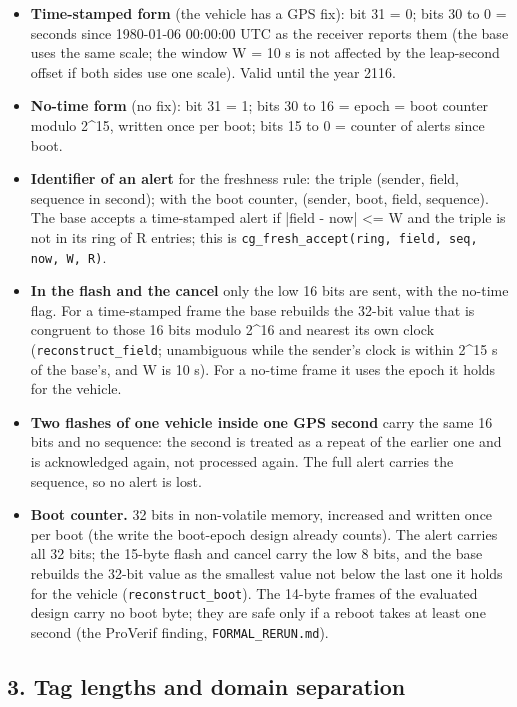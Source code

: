 \begin{itemize}
\item \textbf{Time-stamped form} (the vehicle has a GPS fix): bit 31 = 0; bits 30 to 0 = seconds since 1980-01-06 00:00:00 UTC as the receiver reports them (the base uses the same scale; the window W = 10 s is not affected by the leap-second offset if both sides use one scale). Valid until the year 2116.
\item \textbf{No-time form} (no fix): bit 31 = 1; bits 30 to 16 = epoch = boot counter modulo 2\textasciicircum{}15, written once per boot; bits 15 to 0 = counter of alerts since boot.
\item \textbf{Identifier of an alert} for the freshness rule: the triple (sender, field, sequence in second); with the boot counter, (sender, boot, field, sequence). The base accepts a time-stamped alert if |field - now| <= W and the triple is not in its ring of R entries; this is \texttt{cg\_fresh\_accept(ring, field, seq, now, W, R)}.
\item \textbf{In the flash and the cancel} only the low 16 bits are sent, with the no-time flag. For a time-stamped frame the base rebuilds the 32-bit value that is congruent to those 16 bits modulo 2\textasciicircum{}16 and nearest its own clock (\texttt{reconstruct\_field}; unambiguous while the sender's clock is within 2\textasciicircum{}15 s of the base's, and W is 10 s). For a no-time frame it uses the epoch it holds for the vehicle.
\item \textbf{Two flashes of one vehicle inside one GPS second} carry the same 16 bits and no sequence: the second is treated as a repeat of the earlier one and is acknowledged again, not processed again. The full alert carries the sequence, so no alert is lost.
\item \textbf{Boot counter.} 32 bits in non-volatile memory, increased and written once per boot (the write the boot-epoch design already counts). The alert carries all 32 bits; the 15-byte flash and cancel carry the low 8 bits, and the base rebuilds the 32-bit value as the smallest value not below the last one it holds for the vehicle (\texttt{reconstruct\_boot}). The 14-byte frames of the evaluated design carry no boot byte; they are safe only if a reboot takes at least one second (the ProVerif finding, \texttt{FORMAL\_RERUN.md}).
\end{itemize}

\subsection*{3. Tag lengths and domain separation}

